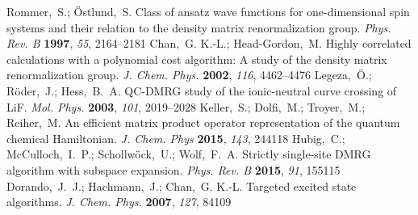 \documentclass[journal=jctcce]{achemso}
\begin{document}
\begin{mcitethebibliography}{79}
{\mcitedefaultendpunct}{\mcitedefaultseppunct}\relax
\EndOfBibitem
{}
Rommer,~S.; {\"{O}}stlund,~S. {Class of ansatz wave functions for
  one-dimensional spin systems and their relation to the density matrix
  renormalization group}. \emph{Phys. Rev. B} \textbf{1997}, \emph{55},
  2164--2181\relax
\mciteBstWouldAddEndPuncttrue
\mciteSetBstMidEndSepPunct{\mcitedefaultmidpunct}
{\mcitedefaultendpunct}{\mcitedefaultseppunct}\relax
\EndOfBibitem
{}
Chan,~G. K.-L.; Head-Gordon,~M. {Highly correlated calculations with a
  polynomial cost algorithm: A study of the density matrix renormalization
  group}. \emph{J. Chem. Phys.} \textbf{2002}, \emph{116}, 4462--4476\relax
\mciteBstWouldAddEndPuncttrue
\mciteSetBstMidEndSepPunct{\mcitedefaultmidpunct}
{\mcitedefaultendpunct}{\mcitedefaultseppunct}\relax
\EndOfBibitem
{}
Legeza,~{\"{O}}.; R{\"{o}}der,~J.; Hess,~B.~A. {QC-DMRG study of the
  ionic-neutral curve crossing of LiF}. \emph{Mol. Phys.} \textbf{2003},
  \emph{101}, 2019--2028\relax
\mciteBstWouldAddEndPuncttrue
\mciteSetBstMidEndSepPunct{\mcitedefaultmidpunct}
{\mcitedefaultendpunct}{\mcitedefaultseppunct}\relax
\EndOfBibitem
{}
Keller,~S.; Dolfi,~M.; Troyer,~M.; Reiher,~M. {An efficient matrix product
  operator representation of the quantum chemical Hamiltonian}. \emph{J. Chem.
  Phys} \textbf{2015}, \emph{143}, 244118\relax
\mciteBstWouldAddEndPuncttrue
\mciteSetBstMidEndSepPunct{\mcitedefaultmidpunct}
{\mcitedefaultendpunct}{\mcitedefaultseppunct}\relax
\EndOfBibitem
{}
Hubig,~C.; McCulloch,~I.~P.; Schollw{\"{o}}ck,~U.; Wolf,~F.~A. {Strictly
  single-site DMRG algorithm with subspace expansion}. \emph{Phys. Rev. B}
  \textbf{2015}, \emph{91}, 155115\relax
\mciteBstWouldAddEndPuncttrue
\mciteSetBstMidEndSepPunct{\mcitedefaultmidpunct}
{\mcitedefaultendpunct}{\mcitedefaultseppunct}\relax
\EndOfBibitem
{}
Dorando,~J.~J.; Hachmann,~J.; Chan,~G. K.-L. {Targeted excited state
  algorithms}. \emph{J. Chem. Phys.} \textbf{2007}, \emph{127}, 84109\relax
\mciteBstWouldAddEndPuncttrue
\mciteSetBstMidEndSepPunct{\mcitedefaultmidpunct}

\end{mcitethebibliography}
\end{document}
